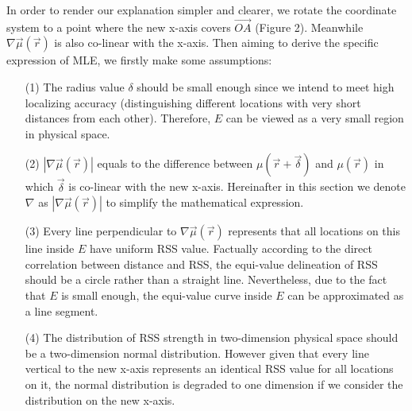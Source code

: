 \documentclass[journal]{IEEEtran}
\begin{document}
In order to render our explanation simpler and clearer, we rotate the coordinate system to a point where the new x-axis covers $\overrightarrow{OA}$ (Figure 2). Meanwhile $\nabla \vec \mu (\vec r)$ is also co-linear with the x-axis. Then aiming to derive the specific expression of MLE, we firstly make some assumptions:
\begin{itemize}
\item[(1)] The radius value $\delta$ should be small enough since we intend to meet high localizing accuracy (distinguishing different locations with very short distances from each other). Therefore, $E$ can be viewed as a very small region in physical space.
\item[(2)] $\left| {\nabla \vec \mu (\vec r)} \right|$ equals to the difference between $\mu (\vec r + \vec \delta )$ and $\mu (\vec r)$ in which $\vec \delta $ is co-linear with the new x-axis. Hereinafter in this section we denote $\nabla$ as $\left| {\nabla \vec \mu (\vec r)} \right|$ to simplify the mathematical expression.
\item[(3)] Every line perpendicular to $\nabla \vec \mu (\vec r)$ represents that all locations on this line inside $E$ have uniform RSS value. Factually according to the direct correlation between distance and RSS, the equi-value delineation of RSS should be a circle rather than a straight line. Nevertheless, due to the fact that $E$ is small enough, the equi-value curve inside $E$ can be approximated as a line segment.
\item[(4)] The distribution of RSS strength in two-dimension physical space should be a two-dimension normal distribution. However given that every line vertical to the new x-axis represents an identical RSS value for all locations on it, the normal distribution is degraded to one dimension if we consider the distribution on the new x-axis.
\end{itemize}
\end{document}
